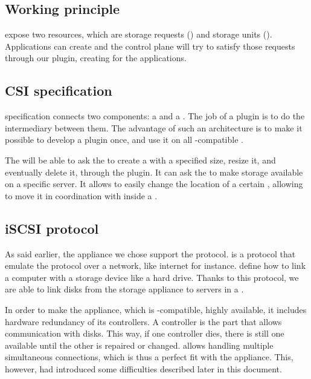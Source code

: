 \subsection{Working principle}

  expose two resources, which are storage requests () and storage units (). Applications can create  and the  control plane will try to satisfy those requests through our  plugin, creating  for the applications.

\subsection{CSI specification}

 specification connects two components: a  and a . The job of a  plugin is to do the intermediary between them. The advantage of such an architecture is to make it possible to develop a plugin once, and use it on all -compatible .

The  will be able to ask the  to create a  with a specified size, resize it, and eventually delete it, through the  plugin. It can ask the  to make storage available on a specific server. It allows to easily change the location of a certain , allowing to move it in coordination with  inside a .

\subsection{iSCSI protocol}

As said earlier, the appliance we chose support the  protocol.  is a protocol that emulate the  protocol over a network, like internet for instance.  define how to link a computer with a storage device like a hard drive. Thanks to this protocol, we are able to link disks from the storage appliance to servers in a  .

In order to make the appliance, which is -compatible, highly available, it includes hardware redundancy of its controllers. A controller is the part that allows communication with disks. This way, if one controller dies, there is still one available until the other is repaired or changed.  allows handling multiple simultaneous connections, which is thus a perfect fit with the appliance. This, however, had introduced some difficulties described later in this document.

